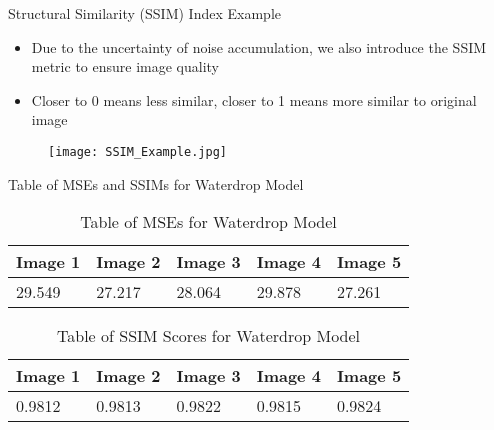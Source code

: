 \documentclass[aspectratio=169,xcolor=dvipsnames]{beamer}
\begin{document}
\begin{frame}{Structural Similarity (SSIM) Index Example}
\begin{itemize}
    \item Due to the uncertainty of noise accumulation, we also introduce the SSIM metric to ensure image quality
    \item Closer to 0 means less similar, closer to 1 means more similar to original image
\end{itemize}

\begin{figure}
    \centering
    \texttt{[image: SSIM\_Example.jpg]}
\end{figure}
\end{frame}

\begin{frame}{Table of MSEs and SSIMs for Waterdrop Model}
    \begingroup
\singlespacing
\begin{table}[!h]
\centering
\begin{tabular}{|p{2cm}|p{2cm}|p{2cm}|p{2cm}|p{2cm}|}
\hline
 \textbf{Image 1} & \textbf{Image 2} & \textbf{Image 3} & \textbf{Image 4} &
 \textbf{Image 5}\\
\hline
  29.549  & 27.217  & 28.064 & 29.878 & 27.261  \\
\hline

\end{tabular}
\caption{Table of MSEs for Waterdrop Model}
\label{tab:mse_waterdrop}
\end{table}
\endgroup

\begingroup
\singlespacing
\begin{table}[!h]
\centering
\begin{tabular}{|p{2cm}|p{2cm}|p{2cm}|p{2cm}|p{2cm}|}
\hline
 \textbf{Image 1} & \textbf{Image 2} & \textbf{Image 3} & \textbf{Image 4} &
 \textbf{Image 5}\\
\hline
  0.9812  & 0.9813  & 0.9822 & 0.9815 & 0.9824  \\
\hline

\end{tabular}
\caption{Table of SSIM Scores for Waterdrop Model}
\label{tab:ssim_water}
\end{table}
\endgroup
\end{frame}

\end{document}
